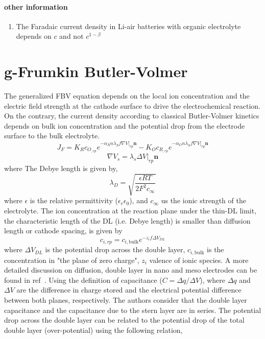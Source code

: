 \documentclass[12pt]{book}
\begin{document}
\paragraph{other information}
\begin{enumerate}
	\item[\cite{Xue2015}] The Faradaic current density in Li-air batteries with organic electrolyte depends on $c$ and not $c^{1-\beta}$
\end{enumerate}

\section{g-Frumkin Butler-Volmer}
The generalized FBV equation depends on the local ion concentration and the electric field strength at the cathode surface to drive the electrochemical reaction. On the contrary, the current density according to classical Butler-Volmer kinetics depends on bulk ion concentration and the potential drop from the electrode surface to the bulk electrolyte.
\begin{equation}
J_F = K_Rc_{O_{,rp}}e^{-\alpha_R n \lambda_Sf\left.\nabla V\right|_{rp}  \textbf{n}} - K_Oc_{R_{,rp}}e^{-\alpha_O n \lambda_Sf\left.\nabla V\right|_{rp} \textbf{n}}
\end{equation}
\begin{equation}
\nabla V_s = \lambda_s\left.\Delta V\right|_{rp} \textbf{n}
\end{equation}
where 
The Debye length is given by,
\begin{equation}
\lambda_D = \sqrt{\frac{\epsilon RT}{2F^2c_\infty}}
\end{equation}
where $\epsilon$ is the relative permittivity ($\epsilon_r\epsilon_0$), and $c_\infty$ us the ionic strength of the electrolyte. 
The ion concentration at the reaction plane under the thin-DL limit, the characteristic length of the DL (i.e. Debye length) is smaller than diffusion length or cathode spacing, is given by 
\begin{equation}
c_{i,{rp}} = c_{i,\textrm{bulk}} e^{-z_if\Delta V_{DL}}
\end{equation}
where $\Delta V_{DL}$ is the potential drop across the double layer, $c_{i,\textrm{bulk}}$ is  the concentration in "the plane of zero charge", $z_i$ valence of ionic species. A more detailed discussion on diffusion, double layer in nano and meso electrodes can be found in ref~\cite{Bazant2009}.  Using the definition of capacitance ($C  = \Delta q/\Delta V$), where $\Delta q$ and $\Delta V$ are the difference in charge stored and the electrical potential difference between both planes, respectively. The authors consider that the double layer capacitance and the capacitance due to the stern layer are in series. The potential drop across the double layer can be related to the potential drop of the total double layer (over-potential) using the following relation,
\end{document}
